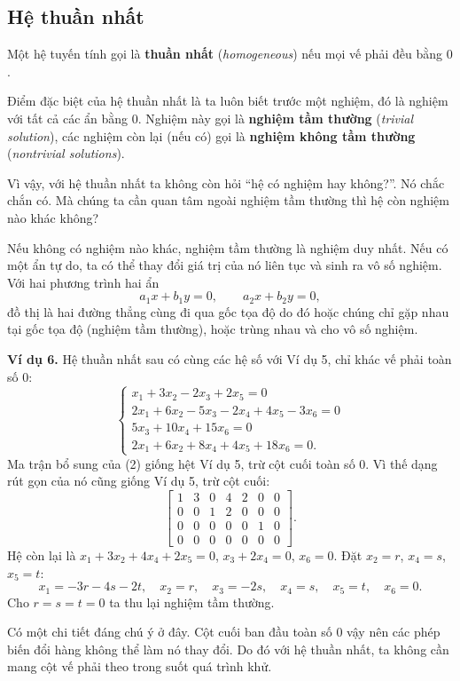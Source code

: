 \documentclass[12pt,a4paper]{article}
\begin{document}
\subsection{Hệ thuần nhất}

Một hệ tuyến tính gọi là \textbf{thuần nhất} (\emph{homogeneous}) nếu mọi vế phải đều bằng \(0\).

Điểm đặc biệt của hệ thuần nhất là ta luôn biết trước một nghiệm, đó là nghiệm với tất cả các ẩn bằng \(0\). Nghiệm này gọi là \textbf{nghiệm tầm thường} (\emph{trivial solution}), các nghiệm còn lại (nếu có) gọi là \textbf{nghiệm không tầm thường} (\emph{nontrivial solutions}).

Vì vậy, với hệ thuần nhất ta không còn hỏi ``hệ có nghiệm hay không?''. Nó chắc chắn có. Mà chúng ta cần quan tâm ngoài nghiệm tầm thường thì hệ còn nghiệm nào khác không?

Nếu không có nghiệm nào khác, nghiệm tầm thường là nghiệm duy nhất. Nếu có một ẩn tự do, ta có thể thay đổi giá trị của nó liên tục và sinh ra vô số nghiệm. Với hai phương trình hai ẩn
$$
a_1x+b_1y=0,\qquad a_2x+b_2y=0,
$$
đồ thị là hai đường thẳng cùng đi qua gốc tọa độ do đó hoặc chúng chỉ gặp nhau tại gốc tọa độ (nghiệm tầm thường), hoặc trùng nhau và cho vô số nghiệm.

\textbf{Ví dụ 6.} Hệ thuần nhất sau có cùng các hệ số với Ví dụ 5, chỉ khác vế phải toàn số \(0\):
$$
\begin{cases}
x_1+3x_2-2x_3+2x_5=0 \\
2x_1+6x_2-5x_3-2x_4+4x_5-3x_6=0 \\
5x_3+10x_4+15x_6=0 \\
2x_1+6x_2+8x_4+4x_5+18x_6=0.
\end{cases} \tag{2}
$$
Ma trận bổ sung của (2) giống hệt Ví dụ 5, trừ cột cuối toàn số \(0\). Vì thế dạng rút gọn của nó cũng giống Ví dụ 5, trừ cột cuối:
$$
\left[ \begin{array}{cccccc|c} 1 & 3 & 0 & 4 & 2 & 0 & 0 \\ 0 & 0 & 1 & 2 & 0 & 0 & 0 \\ 0 & 0 & 0 & 0 & 0 & 1 & 0 \\ 0 & 0 & 0 & 0 & 0 & 0 & 0 \end{array} \right].
$$
Hệ còn lại là \(x_1+3x_2+4x_4+2x_5=0\), \(x_3+2x_4=0\), \(x_6=0\). Đặt \(x_2=r\), \(x_4=s\), \(x_5=t\):
$$
x_1=-3r-4s-2t,\quad x_2=r,\quad x_3=-2s,\quad x_4=s,\quad x_5=t,\quad x_6=0. \tag{3}
$$
Cho \(r=s=t=0\) ta thu lại nghiệm tầm thường.

Có một chi tiết đáng chú ý ở đây. Cột cuối ban đầu toàn số \(0\) vậy nên các phép biến đổi hàng không thể làm nó thay đổi. Do đó với hệ thuần nhất, ta không cần mang cột vế phải theo trong suốt quá trình khử.
\end{document}
